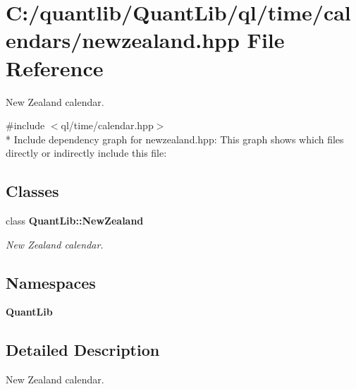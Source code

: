 \section{C\+:/quantlib/\+Quant\+Lib/ql/time/calendars/newzealand.hpp File Reference}
\label{newzealand_8hpp}


New Zealand calendar.  


{\ttfamily \#include $<$ql/time/calendar.\+hpp$>$}\\*
Include dependency graph for newzealand.\+hpp\+:
This graph shows which files directly or indirectly include this file\+:
\subsection*{Classes}
\begin{DoxyCompactItemize}
\item 
class {\bf Quant\+Lib\+::\+New\+Zealand}
\begin{DoxyCompactList}\small\item\em New Zealand calendar. \end{DoxyCompactList}\end{DoxyCompactItemize}
\subsection*{Namespaces}
\begin{DoxyCompactItemize}
\item 
 {\bf Quant\+Lib}
\end{DoxyCompactItemize}


\subsection{Detailed Description}
New Zealand calendar. 

